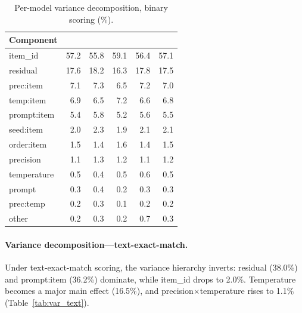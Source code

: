 \documentclass[11pt,twocolumn]{article}
\begin{document}
\begin{table}[t]
\centering
\caption{Per-model variance decomposition, binary scoring (\%).}
\label{tab:var_binary}
\small
\begin{tabular}{lRRRRR}
\toprule
Component &  &  &  &  &  \\
\midrule
item\_id & 57.2 & 55.8 & 59.1 & 56.4 & 57.1 \\
residual & 17.6 & 18.2 & 16.3 & 17.8 & 17.5 \\
prec:item & 7.1 & 7.3 & 6.5 & 7.2 & 7.0 \\
temp:item & 6.9 & 6.5 & 7.2 & 6.6 & 6.8 \\
prompt:item & 5.4 & 5.8 & 5.2 & 5.6 & 5.5 \\
seed:item & 2.0 & 2.3 & 1.9 & 2.1 & 2.1 \\
order:item & 1.5 & 1.4 & 1.6 & 1.4 & 1.5 \\
precision & 1.1 & 1.3 & 1.2 & 1.1 & 1.2 \\
temperature & 0.5 & 0.4 & 0.5 & 0.6 & 0.5 \\
prompt & 0.3 & 0.4 & 0.2 & 0.3 & 0.3 \\
prec:temp & 0.2 & 0.3 & 0.1 & 0.2 & 0.2 \\
other & 0.2 & 0.3 & 0.2 & 0.7 & 0.3 \\
\bottomrule
\end{tabular}
\end{table}

\paragraph{Variance decomposition---text-exact-match.}
Under text-exact-match scoring, the variance hierarchy inverts: residual (38.0\%) and prompt:item (36.2\%) dominate, while item\_id drops to 2.0\%.
Temperature becomes a major main effect (16.5\%), and precision$\times$temperature rises to 1.1\% (Table~\ref{tab:var_text}).
\end{document}
